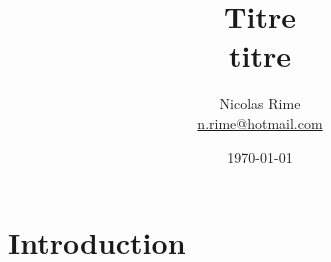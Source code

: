 \documentclass[a4paper,oneside]{article}
\newcommand{\mail}[1]{{\href{mailto:#1}{#1}}}
\begin{document}
\title{\Huge Titre\\
		\huge titre\\ }
\date{\today}
\author{Nicolas Rime\\
{\small	\mail{n.rime@hotmail.com}}}
\maketitle

\baselineskip=16pt
\parindent=15pt
\parskip=5pt

\section{Introduction}

  


%

\end{document}
